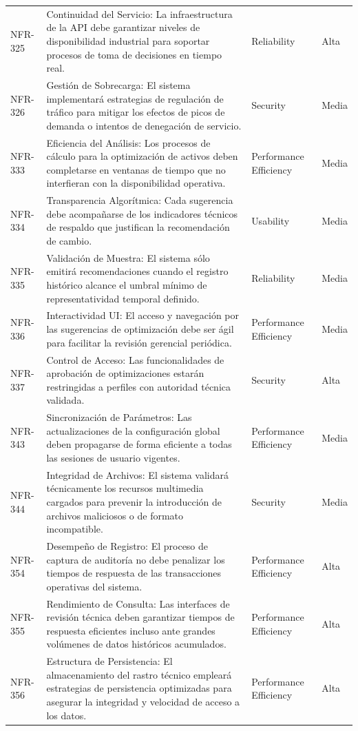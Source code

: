 \begin{longtable}{>{\raggedright\arraybackslash}p{} >{\raggedright\arraybackslash}p{} >{\raggedright\arraybackslash}p{} >{\raggedright\arraybackslash}p{}}
NFR-325 & Continuidad del Servicio: La infraestructura de la API debe garantizar niveles de disponibilidad industrial para soportar procesos de toma de decisiones en tiempo real. & Reliability & Alta \\
NFR-326 & Gestión de Sobrecarga: El sistema implementará estrategias de regulación de tráfico para mitigar los efectos de picos de demanda o intentos de denegación de servicio. & Security & Media \\
NFR-333 & Eficiencia del Análisis: Los procesos de cálculo para la optimización de activos deben completarse en ventanas de tiempo que no interfieran con la disponibilidad operativa. & Performance Efficiency & Media \\
NFR-334 & Transparencia Algorítmica: Cada sugerencia debe acompañarse de los indicadores técnicos de respaldo que justifican la recomendación de cambio. & Usability & Media \\
NFR-335 & Validación de Muestra: El sistema sólo emitirá recomendaciones cuando el registro histórico alcance el umbral mínimo de representatividad temporal definido. & Reliability & Media \\
NFR-336 & Interactividad UI: El acceso y navegación por las sugerencias de optimización debe ser ágil para facilitar la revisión gerencial periódica. & Performance Efficiency & Media \\
NFR-337 & Control de Acceso: Las funcionalidades de aprobación de optimizaciones estarán restringidas a perfiles con autoridad técnica validada. & Security & Alta \\
NFR-343 & Sincronización de Parámetros: Las actualizaciones de la configuración global deben propagarse de forma eficiente a todas las sesiones de usuario vigentes. & Performance Efficiency & Media \\
NFR-344 & Integridad de Archivos: El sistema validará técnicamente los recursos multimedia cargados para prevenir la introducción de archivos maliciosos o de formato incompatible. & Security & Media \\
NFR-354 & Desempeño de Registro: El proceso de captura de auditoría no debe penalizar los tiempos de respuesta de las transacciones operativas del sistema. & Performance Efficiency & Alta \\
NFR-355 & Rendimiento de Consulta: Las interfaces de revisión técnica deben garantizar tiempos de respuesta eficientes incluso ante grandes volúmenes de datos históricos acumulados. & Performance Efficiency & Alta \\
NFR-356 & Estructura de Persistencia: El almacenamiento del rastro técnico empleará estrategias de persistencia optimizadas para asegurar la integridad y velocidad de acceso a los datos. & Performance Efficiency & Alta \\

\end{longtable}
